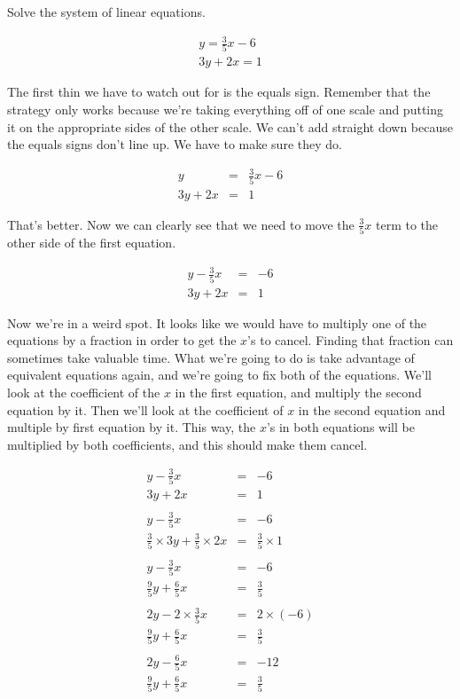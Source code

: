 \begin{example}
Solve the system of linear equations.

$$\begin{array}{c}
y = \frac{3}{5}x - 6\\
3y + 2x = 1 \end{array}$$

The first thin we have to watch out for is the equals sign.  Remember that the strategy only works because we're taking everything off of one scale and putting it on the appropriate sides of the other scale.  We can't add straight down because the equals signs don't line up.  We have to make sure they do.

$$\begin{array}{rcl}
y & = & \frac{3}{5}x - 6\\
3y + 2x & = & 1 \end{array}$$

That's better.  Now we can clearly see that we need to move the $\frac{3}{5}x$ term to the other side of the first equation.

$$\begin{array}{rcl}
y - \frac{3}{5}x & = & -6\\
3y + 2x & = & 1 \end{array}$$

Now we're in a weird spot.  It looks like we would have to multiply one of the equations by a fraction in order to get the $x$'s to cancel.  Finding that fraction can sometimes take valuable time.  What we're going to do is take advantage of equivalent equations again, and we're going to fix both of the equations.  We'll look at the coefficient of the $x$ in the first equation, and multiply the second equation by it.  Then we'll look at the coefficient of $x$ in the second equation and multiple by first equation by it.  This way, the $x$'s in both equations will be multiplied by both coefficients, and this should make them cancel.


$$\begin{array}{rcl}
y - \frac{3}{5}x & = & -6\\
3y + 2x & = & 1\\ \\
y - \frac{3}{5}x & = & -6\\
\frac{3}{5}\times 3y + \frac{3}{5}\times 2x & = & \frac{3}{5}\times 1\\ \\
y - \frac{3}{5}x & = & -6\\
\frac{9}{5}y + \frac{6}{5}x & = & \frac{3}{5}\\ \\
2y - 2\times \frac{3}{5}x & = & 2\times (-6)\\
\frac{9}{5}y + \frac{6}{5}x & = & \frac{3}{5}\\ \\
2y - \frac{6}{5}x & = & -12 \\
\frac{9}{5}y + \frac{6}{5}x & = & \frac{3}{5} \end{array}$$


\end{example}
